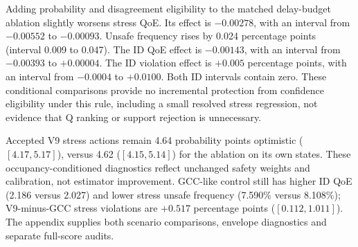 \documentclass[10pt]{article}
\providecommand{\delaybudgetpath}{generated-delay-budget-v9}
\begin{document}
Adding probability and disagreement eligibility to the matched delay-budget ablation slightly worsens stress QoE. Its effect is $-0.00278$, with an interval from $-0.00552$ to $-0.00093$. Unsafe frequency rises by 0.024 percentage points (interval 0.009 to 0.047). The ID QoE effect is $-0.00143$, with an interval from $-0.00393$ to $+0.00004$. The ID violation effect is $+0.005$ percentage points, with an interval from $-0.0004$ to $+0.0100$. Both ID intervals contain zero. These conditional comparisons provide no incremental protection from confidence eligibility under this rule, including a small resolved stress regression, not evidence that Q ranking or support rejection is unnecessary.

Accepted V9 stress actions remain 4.64 probability points optimistic ($[4.17,5.17]$), versus 4.62 ($[4.15,5.14]$) for the ablation on its own states. These occupancy-conditioned diagnostics reflect unchanged safety weights and calibration, not estimator improvement. GCC-like control still has higher ID QoE (2.186 versus 2.027) and lower stress unsafe frequency (7.590\% versus 8.108\%); V9-minus-GCC stress violations are $+0.517$ percentage points ($[0.112,1.011]$). The appendix supplies both scenario comparisons, envelope diagnostics and separate full-score audits.

\begin{table}[t]
\centering\resizebox{\textwidth}{!}{}
\caption{V9 validation lock against V7; V8 is a mechanistic comparator, not another promotion choice. Absolute unsafe frequencies are percentages.}
\label{tab:v9-selection}
\end{table}
\begin{table}[t]
\centering\resizebox{\textwidth}{!}{}
\caption{V9-minus-reference fresh-panel effects. Unsafe-frequency differences are percentage points; intervals resample ten model seeds conditional on this panel. The ablation retains Q ranking and support rejection.}
\label{tab:v9-contrasts}
\end{table}
\begin{table}[t]
\centering\resizebox{\textwidth}{!}{}
\caption{All nine V9 fresh-panel controllers, including rejected V9 and the matched confidence ablation. No post-test winner replaces the validation choice.}
\label{tab:v9-comparison}
\end{table}

\clearpage
\end{document}

